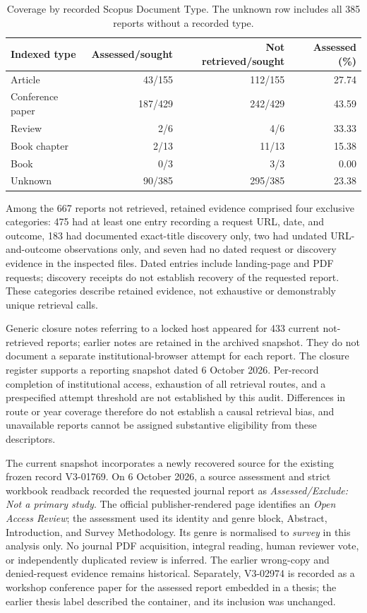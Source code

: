 \documentclass[manuscript,review,screen]{acmart}
\begin{document}
\begin{table}[htbp]
\centering
\caption{Coverage by recorded Scopus Document Type. The unknown row includes all 385 reports without a recorded type.}
\label{tab:indexed-type-coverage-proposal}
\begin{tabular}{lrrr}
\hline
Indexed type & Assessed/sought & Not retrieved/sought & Assessed (\%) \\
\hline
Article & 43/155 & 112/155 & 27.74 \\
Conference paper & 187/429 & 242/429 & 43.59 \\
Review & 2/6 & 4/6 & 33.33 \\
Book chapter & 2/13 & 11/13 & 15.38 \\
Book & 0/3 & 3/3 & 0.00 \\
Unknown & 90/385 & 295/385 & 23.38 \\
\hline
\end{tabular}
\end{table}

Among the 667 reports not retrieved, retained evidence comprised four exclusive categories: 475 had at least one entry recording a request URL, date, and outcome, 183 had documented exact-title discovery only, two had undated URL-and-outcome observations only, and seven had no dated request or discovery evidence in the inspected files. Dated entries include landing-page and PDF requests; discovery receipts do not establish recovery of the requested report. These categories describe retained evidence, not exhaustive or demonstrably unique retrieval calls.

Generic closure notes referring to a locked host appeared for 433 current not-retrieved reports; earlier notes are retained in the archived snapshot. They do not document a separate institutional-browser attempt for each report. The closure register supports a reporting snapshot dated 6 October 2026. Per-record completion of institutional access, exhaustion of all retrieval routes, and a prespecified attempt threshold are not established by this audit. Differences in route or year coverage therefore do not establish a causal retrieval bias, and unavailable reports cannot be assigned substantive eligibility from these descriptors.


The current snapshot incorporates a newly recovered source for the existing frozen record V3-01769. On 6 October 2026, a source assessment and strict workbook readback recorded the requested journal report as \textit{Assessed/Exclude: Not a primary study}. The official publisher-rendered page identifies an \textit{Open Access Review}; the assessment used its identity and genre block, Abstract, Introduction, and Survey Methodology. Its genre is normalised to \textit{survey} in this analysis only. No journal PDF acquisition, integral reading, human reviewer vote, or independently duplicated review is inferred. The earlier wrong-copy and denied-request evidence remains historical. Separately, V3-02974 is recorded as a workshop conference paper for the assessed report embedded in a thesis; the earlier thesis label described the container, and its inclusion was unchanged.
\end{document}
